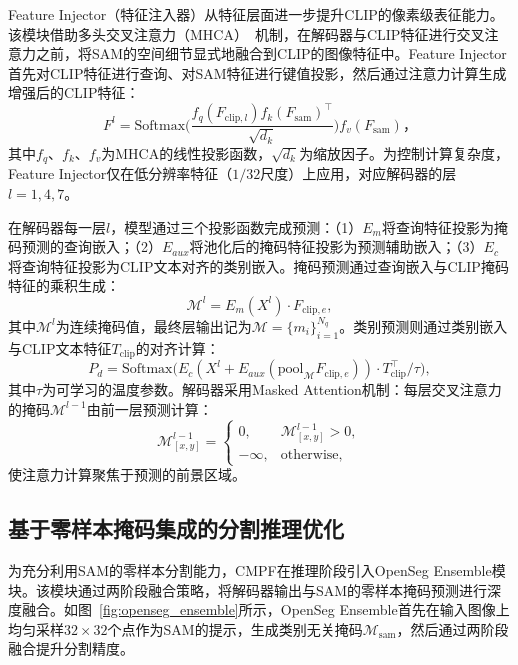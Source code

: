 Feature Injector（特征注入器）从特征层面进一步提升CLIP的像素级表征能力。该模块借助多头交叉注意力（MHCA）~\cite{vaswani2017attention}机制，在解码器与CLIP特征进行交叉注意力之前，将SAM的空间细节显式地融合到CLIP的图像特征中。Feature Injector首先对CLIP特征进行查询、对SAM特征进行键值投影，然后通过注意力计算生成增强后的CLIP特征：
\begin{equation}
F^l = \mathrm{Softmax}\bigg(\frac{f_q(F_{\mathrm{clip},l})f_k(F_{\mathrm{sam}})^\top}{\sqrt{d_k}}\bigg) f_v(F_{\mathrm{sam}})，
\label{eq:feature_injector}
\end{equation}
其中$f_q$、$f_k$、$f_v$为MHCA的线性投影函数，$\sqrt{d_k}$为缩放因子。为控制计算复杂度，Feature Injector仅在低分辨率特征（$1/32$尺度）上应用，对应解码器的层$l=1,4,7$。

在解码器每一层$l$，模型通过三个投影函数完成预测：（1）$E_m$将查询特征投影为掩码预测的查询嵌入；（2）$E_{aux}$将池化后的掩码特征投影为预测辅助嵌入；（3）$E_c$将查询特征投影为CLIP文本对齐的类别嵌入。掩码预测通过查询嵌入与CLIP掩码特征的乘积生成：
\begin{equation}
\mathcal{M}^l = E_m(X^l) \cdot F_{\mathrm{clip},e},
\label{eq:mask_pred}
\end{equation}
其中$\mathcal{M}^l$为连续掩码值，最终层输出记为$\mathcal{M}=\{m_i\}_{i=1}^{N_q}$。类别预测则通过类别嵌入与CLIP文本特征$T_{\mathrm{clip}}$的对齐计算：
\begin{equation}
P_d = \mathrm{Softmax}\big(E_c(X^l + E_{aux}(\mathrm{pool}_{\mathcal{M}} F_{\mathrm{clip},e})) \cdot T_{\mathrm{clip}}^\top / \tau\big),
\label{eq:class_pred}
\end{equation}
其中$\tau$为可学习的温度参数。解码器采用Masked Attention机制：每层交叉注意力的掩码$\mathcal{M}^{l-1}$由前一层预测计算：
\begin{equation}
\mathcal{M}^{l-1}_{[x,y]} = \begin{cases} 0, & \mathcal{M}^{l-1}_{[x,y]} > 0, \\ -\infty, & \text{otherwise}, \end{cases}
\label{eq:mask_attn}
\end{equation}
使注意力计算聚焦于预测的前景区域。

\subsection{基于零样本掩码集成的分割推理优化}

\label{sec:chap4_openseg_ensemble}

为充分利用SAM的零样本分割能力，CMPF在推理阶段引入OpenSeg Ensemble模块。该模块通过两阶段融合策略，将解码器输出与SAM的零样本掩码预测进行深度融合。如图~\ref{fig:openseg_ensemble}所示，OpenSeg Ensemble首先在输入图像上均匀采样$32\times 32$个点作为SAM的提示，生成类别无关掩码$\mathcal{M}_{\mathrm{sam}}$，然后通过两阶段融合提升分割精度。

